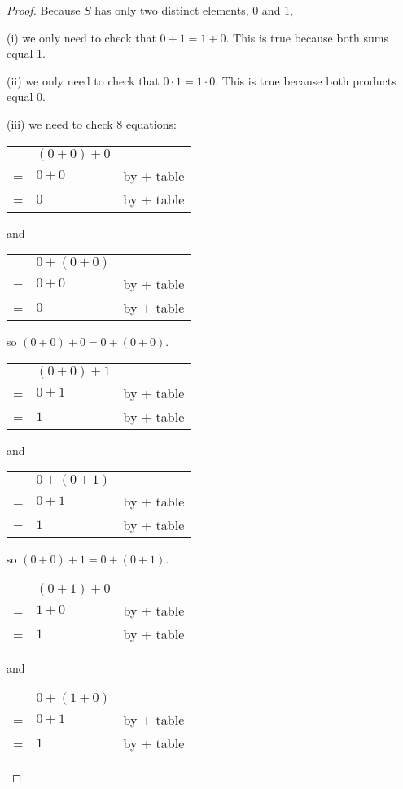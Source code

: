 \documentclass[14pt]{extarticle}
\newcommand{\cy}{\color{cyan}}
\begin{document}
\begin{proof}
  Because $S$ has only two distinct elements, 0 and 1,

  (i) we only need to check that \(0 + 1 = 1 + 0\). This is true because both sums equal 1.

  (ii) we only need to check that \(0 \cdot 1 = 1 \cdot 0\). This is true because both products equal 0.

  (iii) we need to check 8 equations:

  \begin{tabular}{cll}
      & \((0 + 0) + 0\) &                  \\
    = & \(0 + 0\)       & {\cy by + table} \\
    = & \(0\)           & {\cy by + table}
  \end{tabular}
  and
  \begin{tabular}{cll}
      & \(0 + (0 + 0)\) &                  \\
    = & \(0 + 0\)       & {\cy by + table} \\
    = & \(0\)           & {\cy by + table}
  \end{tabular}

  so \((0 + 0) + 0 = 0 + (0 + 0)\).

  \begin{tabular}{cll}
      & \((0 + 0) + 1\) &                  \\
    = & \(0 + 1\)       & {\cy by + table} \\
    = & \(1\)           & {\cy by + table}
  \end{tabular}
  and
  \begin{tabular}{cll}
      & \(0 + (0 + 1)\) &                  \\
    = & \(0 + 1\)       & {\cy by + table} \\
    = & \(1\)           & {\cy by + table}
  \end{tabular}

  so \((0 + 0) + 1 = 0 + (0 + 1)\).

  \begin{tabular}{cll}
      & \((0 + 1) + 0\) &                  \\
    = & \(1 + 0\)       & {\cy by + table} \\
    = & \(1\)           & {\cy by + table}
  \end{tabular}
  and
  \begin{tabular}{cll}
      & \(0 + (1 + 0)\) &                  \\
    = & \(0 + 1\)       & {\cy by + table} \\
    = & \(1\)           & {\cy by + table}
  \end{tabular}


\end{proof}
\end{document}
